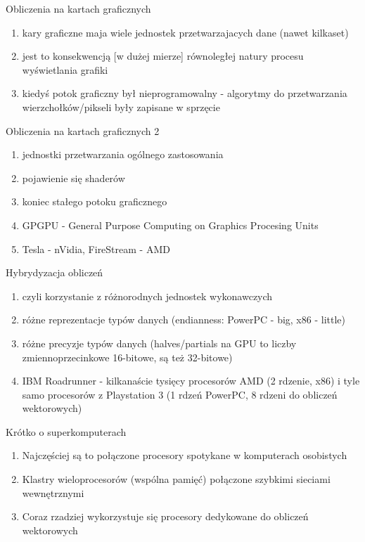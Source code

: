 \documentclass{beamer}
\begin{document}
\begin{frame}{Obliczenia na kartach graficznych}
  \begin{enumerate}
  \item kary graficzne maja wiele jednostek przetwarzajacych dane (nawet kilkaset)
  \item jest to konsekwencją [w dużej mierze] równoległej natury procesu wyświetlania grafiki
  \item kiedyś potok graficzny był nieprogramowalny - algorytmy do przetwarzania wierzchołków/pikseli były zapisane w sprzęcie
  \end{enumerate}
\end{frame}

\begin{frame}{Obliczenia na kartach graficznych 2}
  \begin{enumerate}
  \item jednostki przetwarzania ogólnego zastosowania
  \item pojawienie się shaderów
  \item koniec stałego potoku graficznego
  \item GPGPU - General Purpose Computing on Graphics Procesing Units
  \item Tesla - nVidia, FireStream - AMD
  \end{enumerate}
\end{frame}

\begin{frame}{Hybrydyzacja obliczeń}
  \begin{enumerate}
  \item czyli korzystanie z różnorodnych jednostek wykonawczych
  \item różne reprezentacje typów danych (endianness: PowerPC - big, x86 - little)
  \item różne precyzje typów danych (halves/partials na GPU to liczby zmiennoprzecinkowe 16-bitowe, są też 32-bitowe)
  \item IBM Roadrunner - kilkanaście tysięcy procesorów AMD (2 rdzenie, x86) i tyle samo procesorów z Playstation 3 (1 rdzeń PowerPC, 8 rdzeni do obliczeń wektorowych)
  \end{enumerate}
\end{frame}

\begin{frame}{Krótko o superkomputerach}
  \begin{enumerate}
  \item Najczęściej są to połączone procesory spotykane w komputerach osobistych
  \item Klastry wieloprocesorów (wspólna pamięć) połączone szybkimi sieciami wewnętrznymi
  \item Coraz rzadziej wykorzystuje się procesory dedykowane do obliczeń wektorowych
  \end{enumerate}
\end{frame}
\end{document}
